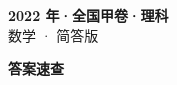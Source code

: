 \documentclass[zihao=-4, a4paper]{ctexart}
\begin{document}
\begin{center}
  {\Large\bfseries 2022 年·全国甲卷·理科}\\[4pt]
  {\large 数学 · 简答版}
\end{center}
\medskip
{}

\clearpage
{}
\begin{center}{\Large\bfseries 答案速查}\end{center}
\medskip

\end{document}
